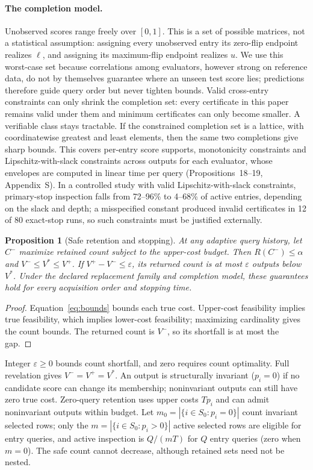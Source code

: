 \documentclass[11pt]{article}
\newtheorem{proposition}{Proposition}
\newcommand{\Sz}{S_0}
\begin{document}
\paragraph{The completion model.} Unobserved scores range freely over $[0,1]$. This is a set of possible matrices, not a statistical assumption: assigning every unobserved entry its zero-flip endpoint realizes $\ell$, and assigning its maximum-flip endpoint realizes $u$. We use this worst-case set because correlations among evaluators, however strong on reference data, do not by themselves guarantee where an unseen test score lies; predictions therefore guide query order but never tighten bounds. Valid cross-entry constraints can only shrink the completion set: every certificate in this paper remains valid under them and minimum certificates can only become smaller. A verifiable class stays tractable. If the constrained completion set is a lattice, with coordinatewise greatest and least elements, then the same two completions give sharp bounds. This covers per-entry score supports, monotonicity constraints and Lipschitz-with-slack constraints across outputs for each evaluator, whose envelopes are computed in linear time per query (Propositions~18--19, Appendix~S). In a controlled study with valid Lipschitz-with-slack constraints, primary-stop inspection falls from 72--96\% to 4--68\% of active entries, depending on the slack and depth; a misspecified constant produced invalid certificates in 12 of 80 exact-stop runs, so such constraints must be justified externally.

\begin{proposition}[Safe retention and stopping]
\label{prop:safe}
At any adaptive query history, let $C^-$ maximize retained count subject to the upper-cost budget. Then $R(C^-)\le\alpha$ and $V^-\le V^*\le V^+$. If $V^+-V^-\le\varepsilon$, its returned count is at most $\varepsilon$ outputs below $V^*$. Under the declared replacement family and completion model, these guarantees hold for every acquisition order and stopping time.
\end{proposition}
\begin{proof}
Equation~\eqref{eq:bounds} bounds each true cost. Upper-cost feasibility implies true feasibility, which implies lower-cost feasibility; maximizing cardinality gives the count bounds. The returned count is $V^-$, so its shortfall is at most the gap.
\end{proof}
Integer $\varepsilon\ge0$ bounds count shortfall, and zero requires count optimality. Full revelation gives $V^-=V^+=V^*$. An output is structurally invariant ($p_i=0$) if no candidate score can change its membership; noninvariant outputs can still have zero true cost. Zero-query retention uses upper costs $Tp_i$ and can admit noninvariant outputs within budget. Let $m_0=|\{i\in\Sz:p_i=0\}|$ count invariant selected rows; only the $m=|\{i\in\Sz:p_i>0\}|$ active selected rows are eligible for entry queries, and active inspection is $Q/(mT)$ for $Q$ entry queries (zero when $m=0$). The safe count cannot decrease, although retained sets need not be nested.
\end{document}
